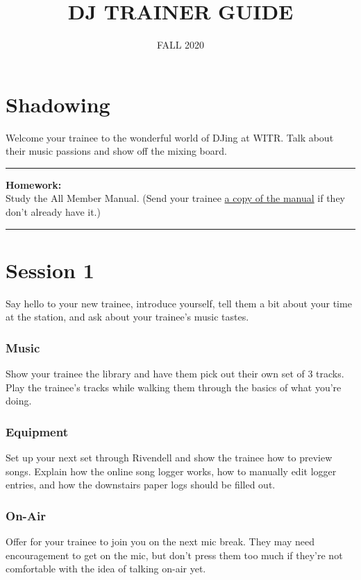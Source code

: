 \documentclass[]{witrman}
\title{DJ TRAINER GUIDE}
\date{FALL 2020}
\newcommand{\makehomework}[1]{%
    \begin{samepage}
        \vspace{2pt}
        \rule{\textwidth}{1pt}
        \textbf{Homework:}\\
        #1\\
        \rule[3pt]{\textwidth}{1pt}
    \end{samepage}
}
\begin{document}
\maketitle

\maketoc{}

\setpagebg{}

\chapter{Shadowing}

Welcome your trainee to the wonderful world of DJing at WITR\@. Talk about their
music passions and show off the mixing board.

\makehomework{Study the All Member Manual.  (Send your trainee
\href{https://github.com/WITR-Radio/manuals/releases}{a copy of the
manual} if they don't already have it.)}


\chapter{Session 1}

Say hello to your new trainee, introduce yourself, tell them a bit about your
time at the station, and ask about your trainee's music tastes.

\subsection{Music}

Show your trainee the library and have them pick out their own set of 3 tracks.
Play the trainee's tracks while walking them through the basics of what you're
doing.

\subsection{Equipment}

Set up your next set through Rivendell and show the trainee how to preview
songs.  Explain how the online song logger works, how to manually edit logger
entries, and how the downstairs paper logs should be filled out.

\subsection{On-Air}

Offer for your trainee to join you on the next mic break.  They may need
encouragement to get on the mic, but don't press them too much if they're not
comfortable with the idea of talking on-air yet.
\end{document}

